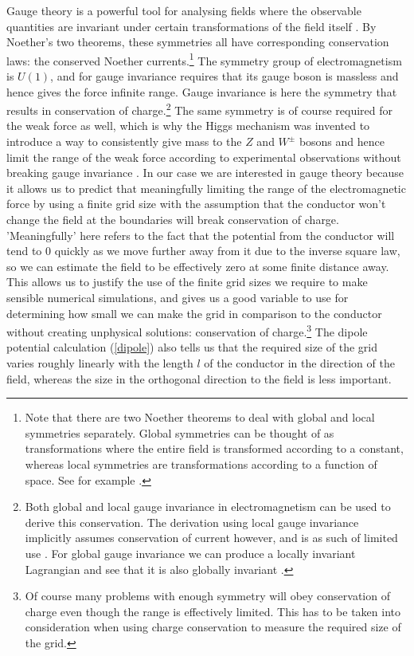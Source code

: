 \documentclass[aps,twocolumn,pre,nofootinbib,10pt]{revtex4-1}
\begin{document}
Gauge theory is a powerful tool for analysing fields where the observable quantities are invariant under certain transformations of the field itself \cite{gaugetheory1}. By Noether's two theorems, these symmetries all have corresponding conservation laws: the conserved Noether currents.\footnote{Note that there are two Noether theorems to deal with global and local symmetries separately. Global symmetries can be thought of as transformations where the entire field is transformed according to a constant, whereas local symmetries are transformations according to a function of space. See for example \cite{gaugetheory2}.} The symmetry group of electromagnetism is $U(1)$, and for gauge invariance requires that its gauge boson is massless and hence gives the force infinite range. Gauge invariance is here the symmetry that results in conservation 
of charge.\footnote{Both global and local gauge invariance in electromagnetism can be used to derive this conservation. The derivation using local gauge invariance implicitly assumes conservation of current however, and is as such of limited use \cite{gaugetheory4}. For global gauge invariance we can produce a locally invariant Lagrangian and see that it is also globally invariant \cite{qft}.} The same symmetry is of course required for the weak force as well, which is why the Higgs mechanism was invented to introduce a way to consistently give mass to the 
$Z$ and $W^{\pm}$ bosons and hence limit the range of the weak force according to experimental observations without breaking gauge invariance \cite{gaugetheory3}. In our case we are interested in gauge theory because it allows us to predict that meaningfully limiting the range of the electromagnetic force by using a finite grid size with the assumption that the conductor won't change the field at the 
boundaries will break conservation of charge. 'Meaningfully' here refers to the fact that the potential from the conductor will tend to 0 quickly as we move further away from it due to the inverse square law, so we can estimate the field to be effectively zero at some finite distance away. This allows us to justify the use of the finite grid sizes we require to make sensible numerical simulations, and gives us a good variable to use for determining how small we can make the grid in comparison to the conductor without creating unphysical solutions: conservation of charge.\footnote{Of course many problems with enough symmetry will obey conservation of charge even though the range is effectively limited. This has to be taken into consideration when using charge conservation to measure the required size of the grid.} The dipole potential calculation (\ref{dipole}) also tells us that the required size of the grid varies roughly linearly with the length $l$ of the conductor in the direction of the field, whereas 
the size in the 
orthogonal direction to the field is less important.
\end{document}

